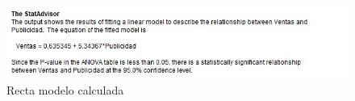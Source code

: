\documentclass[conference]{IEEEtran}
\begin{document}
\begin{figure}[H]
	\begin{center}
		\includegraphics[width=\linewidth]{./Images/Stat2.jpeg}
	\end{center}
	\caption{Recta modelo calculada}
\end{figure}


\end{document}
